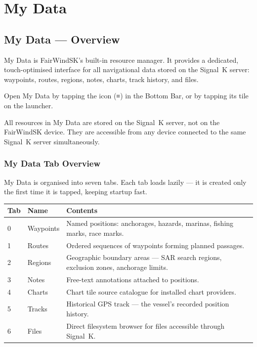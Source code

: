 \part{My Data}

\chapter{My Data --- Overview}
\label{ch:mydata}

My Data is FairWindSK's built-in resource manager.
It provides a dedicated, touch-optimised interface for all navigational data stored on the Signal~K
server: waypoints, routes, regions, notes, charts, track history, and files.

Open My Data by tapping the  icon (≡) in the Bottom Bar, or by tapping its tile on the
launcher.


\begin{notebox}
All resources in My Data are stored on the Signal~K server, not on the FairWindSK device.
They are accessible from any device connected to the same Signal~K server simultaneously.
\end{notebox}

\section{My Data Tab Overview}

My Data is organised into seven tabs.
Each tab loads lazily --- it is created only the first time it is tapped, keeping startup fast.

\begin{longtable}{C{0.7cm} L{2.8cm} L{10.2cm}}
\toprule
{}
{\sffamily\bfseries\color{white} Tab} &
{\sffamily\bfseries\color{white} Name} &
{\sffamily\bfseries\color{white} Contents} \\
 & Waypoints & Named positions: anchorages, hazards, marinas, fishing marks, race marks. \\
1 & Routes & Ordered sequences of waypoints forming planned passages. \\
2 & Regions & Geographic boundary areas --- SAR search regions, exclusion zones, anchorage limits. \\
3 & Notes & Free-text annotations attached to positions. \\
4 & Charts & Chart tile source catalogue for installed chart providers. \\
5 & Tracks & Historical GPS track --- the vessel's recorded position history. \\
6 & Files & Direct filesystem browser for files accessible through Signal~K. \\
\bottomrule
\end{longtable}

